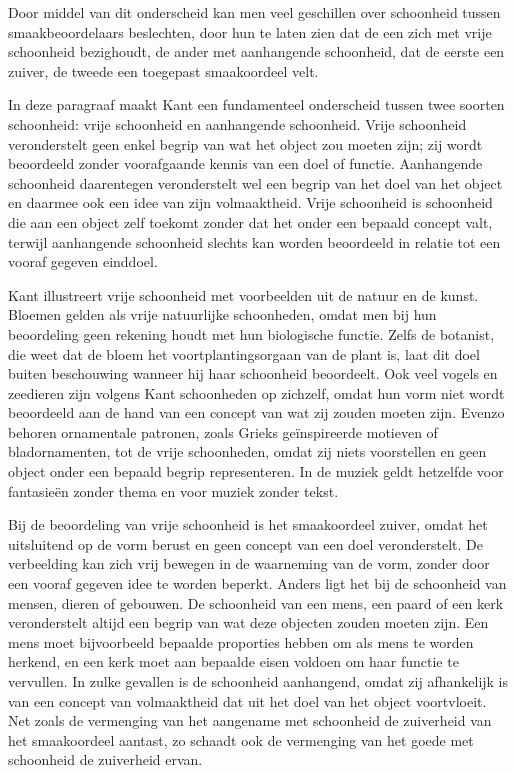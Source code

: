 Door middel van dit onderscheid kan men veel geschillen over schoonheid tussen smaakbeoordelaars beslechten, door hun te laten zien dat de een zich met vrije schoonheid bezighoudt, de ander met aanhangende schoonheid, dat de eerste een zuiver, de tweede een toegepast smaakoordeel velt.

\begin{mdframed}[leftmargin=0pt,rightmargin=0pt,backgroundcolor=blue!6,linecolor=white,innertopmargin=6pt,innerbottommargin=6pt]
In deze paragraaf maakt Kant een fundamenteel onderscheid tussen twee soorten schoonheid: vrije schoonheid en aanhangende schoonheid. Vrije schoonheid veronderstelt geen enkel begrip van wat het object zou moeten zijn; zij wordt beoordeeld zonder voorafgaande kennis van een doel of functie. Aanhangende schoonheid daarentegen veronderstelt wel een begrip van het doel van het object en daarmee ook een idee van zijn volmaaktheid. Vrije schoonheid is schoonheid die aan een object zelf toekomt zonder dat het onder een bepaald concept valt, terwijl aanhangende schoonheid slechts kan worden beoordeeld in relatie tot een vooraf gegeven einddoel.

Kant illustreert vrije schoonheid met voorbeelden uit de natuur en de kunst. Bloemen gelden als vrije natuurlijke schoonheden, omdat men bij hun beoordeling geen rekening houdt met hun biologische functie. Zelfs de botanist, die weet dat de bloem het voortplantingsorgaan van de plant is, laat dit doel buiten beschouwing wanneer hij haar schoonheid beoordeelt. Ook veel vogels en zeedieren zijn volgens Kant schoonheden op zichzelf, omdat hun vorm niet wordt beoordeeld aan de hand van een concept van wat zij zouden moeten zijn. Evenzo behoren ornamentale patronen, zoals Grieks geïnspireerde motieven of bladornamenten, tot de vrije schoonheden, omdat zij niets voorstellen en geen object onder een bepaald begrip representeren. In de muziek geldt hetzelfde voor fantasieën zonder thema en voor muziek zonder tekst.

Bij de beoordeling van vrije schoonheid is het smaakoordeel zuiver, omdat het uitsluitend op de vorm berust en geen concept van een doel veronderstelt. De verbeelding kan zich vrij bewegen in de waarneming van de vorm, zonder door een vooraf gegeven idee te worden beperkt. Anders ligt het bij de schoonheid van mensen, dieren of gebouwen. De schoonheid van een mens, een paard of een kerk veronderstelt altijd een begrip van wat deze objecten zouden moeten zijn. Een mens moet bijvoorbeeld bepaalde proporties hebben om als mens te worden herkend, en een kerk moet aan bepaalde eisen voldoen om haar functie te vervullen. In zulke gevallen is de schoonheid aanhangend, omdat zij afhankelijk is van een concept van volmaaktheid dat uit het doel van het object voortvloeit. Net zoals de vermenging van het aangename met schoonheid de zuiverheid van het smaakoordeel aantast, zo schaadt ook de vermenging van het goede met schoonheid de zuiverheid ervan.


\end{mdframed}
